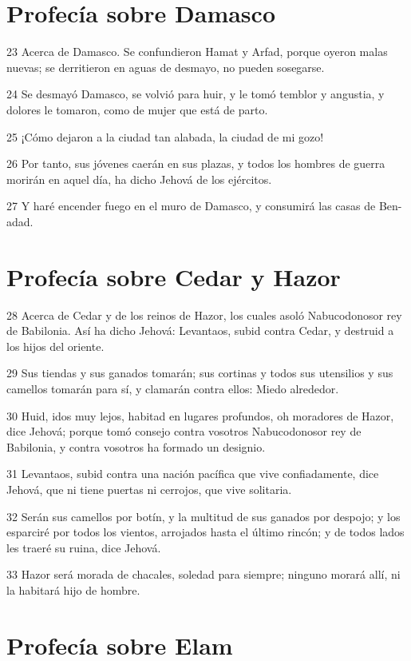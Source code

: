 \section*{Profecía sobre Damasco}

\par 23 Acerca de Damasco. Se confundieron Hamat y Arfad, porque oyeron malas nuevas; se derritieron en aguas de desmayo, no pueden sosegarse.
\par 24 Se desmayó Damasco, se volvió para huir, y le tomó temblor y angustia, y dolores le tomaron, como de mujer que está de parto.
\par 25 ¡Cómo dejaron a la ciudad tan alabada, la ciudad de mi gozo!
\par 26 Por tanto, sus jóvenes caerán en sus plazas, y todos los hombres de guerra morirán en aquel día, ha dicho Jehová de los ejércitos.
\par 27 Y haré encender fuego en el muro de Damasco, y consumirá las casas de Ben-adad.

\section*{Profecía sobre Cedar y Hazor}

\par 28 Acerca de Cedar y de los reinos de Hazor, los cuales asoló Nabucodonosor rey de Babilonia. Así ha dicho Jehová: Levantaos, subid contra Cedar, y destruid a los hijos del oriente.
\par 29 Sus tiendas y sus ganados tomarán; sus cortinas y todos sus utensilios y sus camellos tomarán para sí, y clamarán contra ellos: Miedo alrededor.
\par 30 Huid, idos muy lejos, habitad en lugares profundos, oh moradores de Hazor, dice Jehová; porque tomó consejo contra vosotros Nabucodonosor rey de Babilonia, y contra vosotros ha formado un designio.
\par 31 Levantaos, subid contra una nación pacífica que vive confiadamente, dice Jehová, que ni tiene puertas ni cerrojos, que vive solitaria.
\par 32 Serán sus camellos por botín, y la multitud de sus ganados por despojo; y los esparciré por todos los vientos, arrojados hasta el último rincón; y de todos lados les traeré su ruina, dice Jehová.
\par 33 Hazor será morada de chacales, soledad para siempre; ninguno morará allí, ni la habitará hijo de hombre.

\section*{Profecía sobre Elam}

